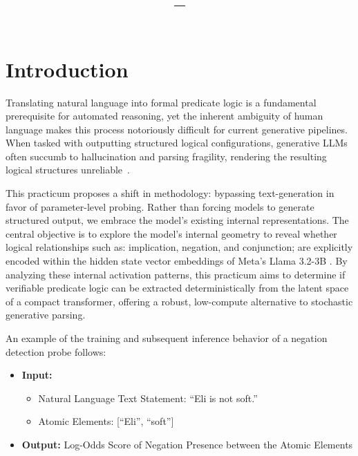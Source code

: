 \documentclass[12 pt]{article}  %
\title{\myassignment \\ \large \myclass--\mysemester \\ \myname}
\begin{document}

\tableofcontents
\listoffigures
\newpage
{}

\section{Introduction}
Translating natural language into formal predicate logic is a fundamental 
prerequisite for automated reasoning, yet the inherent ambiguity of human 
language makes this process notoriously difficult for current generative 
pipelines. When tasked with outputting structured logical configurations, 
generative LLMs often succumb to hallucination and parsing fragility, rendering 
the resulting logical structures unreliable~\cite{jin2022logicalfallacydetection, 
lalwani2025autoformalizingnaturallanguagefirstorder, lu-etal-2022-parsing,
yang2023couplinglargelanguagemodels}. 

This practicum proposes a shift in methodology: bypassing text-generation in 
favor of parameter-level probing. Rather than forcing models to generate 
structured output, we embrace the model's existing internal representations. 
The central objective is to explore the model's internal geometry to reveal 
whether logical relationships such as: implication, negation, and 
conjunction; are explicitly encoded within the hidden state vector embeddings 
of Meta's Llama 3.2-3B \cite{alain2018understandingintermediatelayersusing, 
marks2024geometrytruthemergentlinear}. By analyzing these internal activation 
patterns, this practicum aims to determine if verifiable predicate logic can 
be extracted deterministically from the latent space of a compact transformer, 
offering a robust, low-compute alternative to stochastic generative parsing.

An example of the training and subsequent inference behavior of a negation
detection probe follows:

\begin{itemize}
    \item \textbf{Input:}
    \begin{itemize}
        \item Natural Language Text Statement: ``Eli is not soft.''
        \item Atomic Elements: [``Eli'', ``soft'']
    \end{itemize} 
    \item \textbf{Output:} Log-Odds Score of Negation Presence between the Atomic Elements
\end{itemize}
\end{document}
